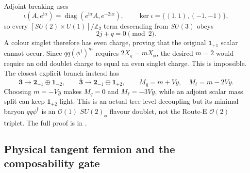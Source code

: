 \documentclass[11pt]{article}
\numberwithin{equation}{section}
\newcommand{\ZZ}{\mathbb Z}
\newcommand{\cO}{\mathcal O}
\newcommand{\ii}{\mathrm i}
\begin{document}
Adjoint breaking uses
\begin{equation}
 \iota(A,e^{\ii\alpha})=
 \operatorname{diag}(e^{\ii\alpha}A,e^{-2\ii\alpha}),\qquad
 \ker\iota=\{(1,1),(-1,-1)\},
 \label{eq:handoff-su3-map}
\end{equation}
so every \([SU(2)\times U(1)]/\ZZ_2\) term descending from \(SU(3)\) obeys
\begin{equation}
 2j+q=0\pmod2.
 \label{eq:handoff-parity}
\end{equation}
A colour singlet therefore has even charge, proving that the original
\(\bm1_{+1}\) scalar cannot occur.  Since \(qq(\phi^\dagger)^m\) requires
\(2X_q=mX_\phi\), the desired \(m=2\) would require an odd doublet charge to
equal an even singlet charge.  This is impossible.  The closest explicit
branch instead has
\begin{equation}
 \bm3\to\bm2_{+1}\oplus\bm1_{-2},\qquad
 \overline{\bm3}\to\bm2_{-1}\oplus\bm1_{+2},
 \qquad M_q=m+Vy,\quad M_\ell=m-2Vy.
 \label{eq:handoff-su3-branch}
\end{equation}
Choosing \(m=-Vy\) makes \(M_q=0\) and \(M_\ell=-3Vy\), while an adjoint
scalar mass split can keep \(\bm1_{+2}\) light.  This is an actual tree-level
decoupling but its minimal baryon \(qq\phi^\dagger\) is an \(\cO(1)\)
\(SU(2)_\phi\) flavour doublet, not the Route-E \(\cO(2)\) triplet.  The full
proof is in
.

\subsection{Physical tangent fermion and the composability gate}
\end{document}
